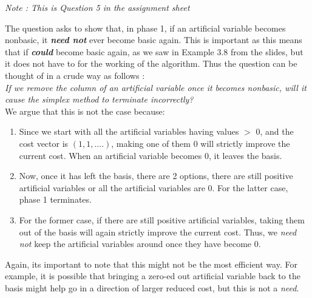 \textit{Note : This is Question 5 in the assignment sheet}

The question asks to show that, in phase 1, if an artificial variable becomes nonbasic, it \textit{\textbf{need not}} ever become basic again. This is important as this means that if \textit{\textbf{could}} become basic again, as we saw in Example 3.8 from the slides, but it does not have to for the working of the algorithm. Thus the question can be thought of in a crude way as follows : \\
\textit{If we remove the column of an artificial variable once it becomes nonbasic, will it cause the simplex method to terminate incorrectly?} \\
We argue that this is not the case because:

\begin{enumerate}
    \item Since we start with all the artificial variables having values $>$ 0, and the cost vector is $(1,1,....)$, making one of them 0 will strictly improve the current cost. When an artificial variable becomes 0, it leaves the basis. 
    \item Now, once it has left the basis, there are 2 options, there are still positive artificial variables or all the artificial variables are 0. For the latter case, phase 1 terminates.
    \item For the former case, if there are still positive artificial variables, taking them out of the basis will again strictly improve the current cost. Thus, we \textit{need not} keep the artificial variables around once they have become 0.
\end{enumerate}

Again, its important to note that this might not be the most efficient way. For example, it is possible that bringing a zero-ed out artificial variable back to the basis might help go in a direction of larger reduced cost, but this is not a \textit{need}.
